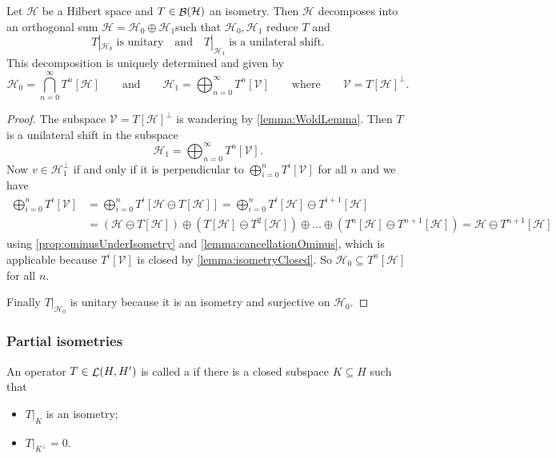 \begin{theorem}
Let $\mathcal{H}$ be a Hilbert space and $T\in\mathop{\mathcal{B}}(\mathcal{H})$ an isometry. Then $\mathcal{H}$ decomposes into an orthogonal sum $\mathcal{H} = \mathcal{H}_0\oplus \mathcal{H}_1$such that $\mathcal{H}_0, \mathcal{H}_1$ reduce $T$ and
\[ T|_{\mathcal{H}_0}\;\text{is unitary} \quad\text{and}\quad T|_{\mathcal{H}_1}\;\text{is a unilateral shift}. \]
This decomposition is uniquely determined and given by
\[ \mathcal{H}_0 = \bigcap_{n=0}^\infty T^n[\mathcal{H}] \qquad\text{and}\qquad \mathcal{H}_1 = \bigoplus_{n=0}^\infty T^n[\mathcal{V}] \qquad\text{where}\qquad \mathcal{V} = T[\mathcal{H}]^\perp. \]
\end{theorem}
\begin{proof}
The subspace $\mathcal{V} = T[\mathcal{H}]^\perp$ is wandering by \ref{lemma:WoldLemma}. Then $T$ is a unilateral shift in the subspace
\[ \mathcal{H}_1 = \bigoplus_{n=0}^\infty T^n[\mathcal{V}]. \]
Now $v\in\mathcal{H}_1^\perp$ if and only if it is perpendicular to $\bigoplus_{i=0}^n T^i[\mathcal{V}]$ for all $n$ and we have
\begin{align*}
\bigoplus_{i=0}^n T^i[\mathcal{V}] &= \bigoplus_{i=0}^n T^i[\mathcal{H}\ominus T[\mathcal{H}]] = \bigoplus_{i=0}^n T^i[\mathcal{H}]\ominus T^{i+1}[\mathcal{H}] \\
&= (\mathcal{H}\ominus T[\mathcal{H}])\oplus(T[\mathcal{H}]\ominus T^2[\mathcal{H}])\oplus \ldots \oplus (T^n[\mathcal{H}]\ominus T^{n+1}[\mathcal{H}])  = \mathcal{H} \ominus T^{n+1}[\mathcal{H}] 
\end{align*}
using \ref{prop:ominusUnderIsometry} and \ref{lemma:cancellationOminus}, which is applicable because $T^i[\mathcal{V}]$ is closed by \ref{lemma:isometryClosed}. So $\mathcal{H}_0\subseteq T^n[\mathcal{H}]$ for all $n$.

Finally $T|_{\mathcal{H}_0}$ is unitary because it is an isometry and surjective on $\mathcal{H}_0$.
\end{proof}

\subsubsection{Partial isometries}
\begin{definition}
An operator $T\in \mathop{\mathcal{L}}(H, H')$ is called a  if there is a closed subspace $K\subseteq H$ such that
\begin{itemize}
\item $T|_K$ is an isometry;
\item $T|_{K^\perp} = 0$.
\end{itemize}
\end{definition}

